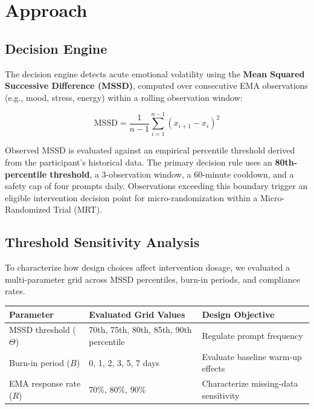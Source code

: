 \documentclass[10pt,letterpaper]{article}
\begin{document}
\section{Approach}

\subsection{Decision Engine}

The decision engine detects acute emotional volatility using the \textbf{Mean Squared Successive Difference (MSSD)}, computed over consecutive EMA observations (e.g., mood, stress, energy) within a rolling observation window:

\begin{equation}
\text{MSSD}
=
\frac{1}{n-1}
\sum_{i=1}^{n-1}
(x_{i+1}-x_i)^2
\end{equation}

Observed MSSD is evaluated against an empirical percentile threshold derived from the participant's historical data. The primary decision rule uses an \textbf{80th-percentile threshold}, a 3-observation window, a 60-minute cooldown, and a safety cap of four prompts daily. Observations exceeding this boundary trigger an eligible intervention decision point for micro-randomization within a Micro-Randomized Trial (MRT).

\subsection{Threshold Sensitivity Analysis}

To characterize how design choices affect intervention dosage, we evaluated a multi-parameter grid across MSSD percentiles, burn-in periods, and compliance rates.

\begin{center}
\footnotesize
\renewcommand{\arraystretch}{1.1}
\begin{tabular}{@{}lll@{}}
\toprule
\textbf{Parameter} & \textbf{Evaluated Grid Values} & \textbf{Design Objective} \\
\midrule
MSSD threshold ($\Theta$)
& 70th, 75th, 80th, 85th, 90th percentile
& Regulate prompt frequency \\

Burn-in period ($B$)
& 0, 1, 2, 3, 5, 7 days
& Evaluate baseline warm-up effects \\

EMA response rate ($R$)
& 70\%, 80\%, 90\%
& Characterize missing-data sensitivity \\
\bottomrule
\end{tabular}
\end{center}
\end{document}
